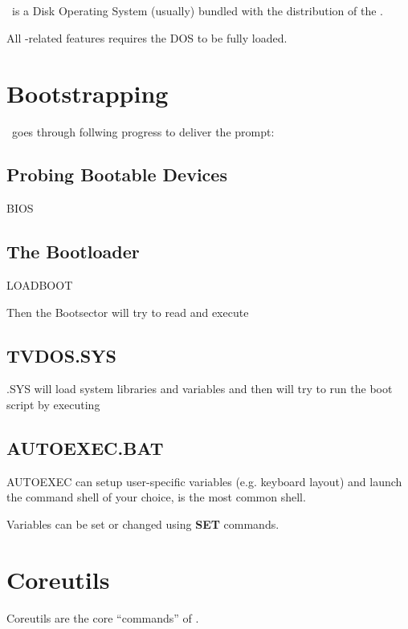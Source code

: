 \chapter{\thedos}

\thedos\ is a Disk Operating System (usually) bundled with the distribution of the \thismachine.

All \thedos-related features requires the DOS to be fully loaded.




\chapter{Bootstrapping}

\thedos\ goes through follwing progress to deliver the  prompt:

\section{Probing Bootable Devices}
BIOS

\section{The Bootloader}
LOADBOOT

Then the Bootsector will try to read and execute 

\section{TVDOS.SYS}
\thedos.SYS will load system libraries and variables and then will try to run the boot script by executing 

\section{AUTOEXEC.BAT}

AUTOEXEC can setup user-specific variables (e.g. keyboard layout) and launch the command shell of your choice,  is the most common shell.

Variables can be set or changed using \textbf{SET} commands.



\chapter{Coreutils}

Coreutils are the core ``commands'' of \thedos.

